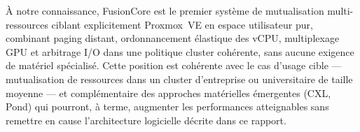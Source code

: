 À notre connaissance, FusionCore est le premier système de mutualisation multi-ressources ciblant explicitement Proxmox~VE en espace utilisateur pur, combinant paging distant, ordonnancement élastique des vCPU, multiplexage GPU et arbitrage I/O dans une politique cluster cohérente, sans aucune exigence de matériel spécialisé. Cette position est cohérente avec le cas d'usage cible — mutualisation de ressources dans un cluster d'entreprise ou universitaire de taille moyenne — et complémentaire des approches matérielles émergentes (CXL, Pond) qui pourront, à terme, augmenter les performances atteignables sans remettre en cause l'architecture logicielle décrite dans ce rapport.